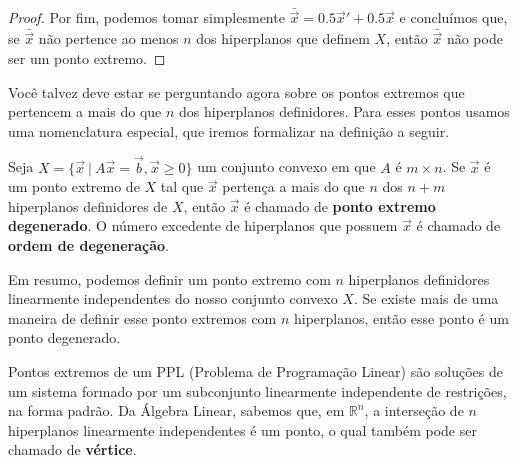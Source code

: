 \begin{thm:ponto extremo}
\begin{proof}
		Por fim, podemos tomar simplesmente $\bar{\vec{x}} = 0.5 \vec{x}' + 0.5 \vec{x}$ e concluímos que, se $\bar{\vec{x}}$ não pertence ao menos $n$ dos hiperplanos que definem $X$, então $\bar{\vec{x}}$ não pode ser um ponto extremo. 
	\end{proof}
\end{thm:ponto extremo}

Você talvez deve estar se perguntando agora sobre os pontos extremos que pertencem a mais do que $n$ dos hiperplanos definidores. Para esses pontos usamos uma nomenclatura especial, que iremos formalizar na definição a seguir.

\begin{def:ponto degenerado}
	Seja $X = \{\vec{x}\ |\ A\vec{x} = \vec{b}, \vec{x} \geq 0\}$ um conjunto convexo em que $A$ é $m \times n$. Se $\vec{x}$ é um ponto extremo de $X$ tal que $\vec{x}$ pertença a mais do que $n$ dos $n + m$ hiperplanos definidores de $X$, então $\vec{x}$ é chamado de \textbf{ponto extremo degenerado}. O número excedente de hiperplanos que possuem $\vec{x}$ é chamado de \textbf{ordem de degeneração}.
\end{def:ponto degenerado}

Em resumo, podemos definir um ponto extremo com $n$ hiperplanos definidores linearmente independentes do nosso conjunto convexo $X$. Se existe mais de uma maneira de definir esse ponto extremos com $n$ hiperplanos, então esse ponto é um ponto degenerado.


Pontos extremos de um PPL (Problema de Programação Linear) são soluções de um sistema formado por um subconjunto linearmente independente de restrições, na forma padrão. Da Álgebra Linear, sabemos que, em $\mathbb{R}^n$, a interseção de $n$ hiperplanos linearmente independentes é um ponto, o qual também pode ser chamado de \textbf{vértice}.

